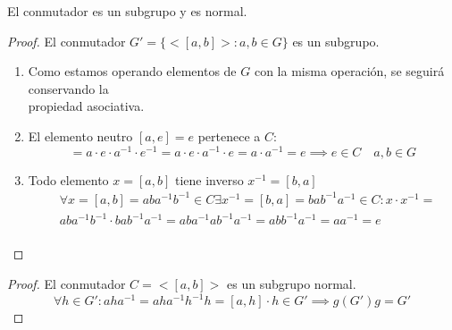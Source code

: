 \begin{thm}
    El conmutador es un subgrupo y es normal.
\end{thm}

\begin{proof}
    El conmutador $G' = \{<[a,b]> : a,b \in G\}$ es un subgrupo.
    \begin{enumerate}
        \item Como estamos operando elementos de $G$ con la misma operación, se seguirá conservando la\\ propiedad asociativa.
        \item El elemento neutro $[a,e] = e$ pertenece a $C$:
            \begin{equation}
                [a,e] = a\cdot e\cdot a^{-1} \cdot e^{-1} = a \cdot e \cdot a^{-1} \cdot e = a \cdot a^{-1} = e \implies e \in C \quad a,b \in G
            \end{equation}
        \item Todo elemento $x = [a,b]$ tiene inverso $x^{-1} = [b,a]$
            \begin{equation}
                \begin{split}
                    & \forall x = [a,b] = aba^{-1}b^{-1} \in C \exists x^{-1} = [b,a] = bab^{-1}a^{-1} \in C : x \cdot x^{-1} =\\
                    & aba^{-1}b^{-1} \cdot bab^{-1}a^{-1} = aba^{-1}ab^{-1}a^{-1} = abb^{-1}a^{-1} = aa^{-1} = e\\   
                \end{split}
            \end{equation}
    \end{enumerate}
\end{proof}

\begin{proof}
    El conmutador $C = <[a,b]>$ es un subgrupo normal.
    \begin{equation}
        \forall h \in G' : aha^{-1} = aha^{-1}h^{-1}h = [a, h] \cdot h \in G' \implies g(G')g = G'
    \end{equation}
\end{proof}

